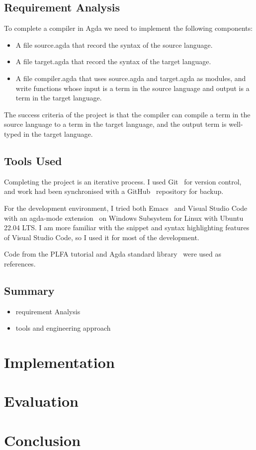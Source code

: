\documentclass[12pt,twoside,a4paper]{report}
\theoremstyle{definition}
\theoremstyle{definition}
\begin{document}
    \section{Requirement Analysis}
    To complete a compiler in Agda we need to implement the following components:
    \begin{itemize}
        \item 
            A file source.agda that record the syntax of the source language.

        \item
            A file target.agda that record the syntax of the target language.

        \item
            A file compiler.agda that uses source.agda and target.agda as modules, and write functions whose input is a term in the source language and output is a term in the target language.
    \end{itemize}
    The success criteria of the project is that the compiler can compile a term in the source language to a term in the target language, and the output term is well-typed in the target language.


    \section{Tools Used}
    Completing the project is an iterative process. I used Git~\cite{git} for version control, and work had been synchronised with a GitHub~\cite{github} repository for backup.

    For the development environment, I tried both Emacs~\cite{emacs} and Visual Studio Code~\cite{vscode} with an agda-mode extension~\cite{agda_mode} on Windows Subsystem for Linux with Ubuntu~\cite{wsl_ubuntu} 22.04 LTS. I am more familiar with the snippet and syntax highlighting features of Visual Studio Code, so I used it for most of the development. 

    Code from the PLFA tutorial and Agda standard library~\cite{agda_std} were used as references. 

    \section{Summary}
    \begin{itemize}
        \item 
        requirement Analysis

        \item
        tools and engineering approach

    \end{itemize}

\chapter{Implementation}

\chapter{Evaluation}

\chapter{Conclusion}

    \printbibliography
\end{document}
